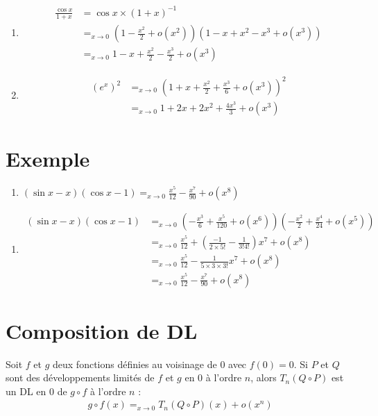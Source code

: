 \documentclass[../main.tex]{subfiles}
\begin{document}
\begin{enumerate}
    \item \begin{align*}
        \frac{\cos x}{1 + x} &= \cos x \times (1 + x)^{-1} \\
        &=_{x\to 0} (1 - \frac{x^2}{2} + o(x^2))(1 - x + x^2 - x^3 + o(x^3)) \\
        &=_{x\to 0} 1 - x + \frac{x^2}{2} - \frac{x^3}{2} + o(x^3)
    \end{align*}

    \item \begin{align*}
        (e^x)^2 &=_{x\to 0} (1 + x + \frac{x^2}{2} + \frac{x^3}{6} + o(x^3))^2 \\
        &=_{x\to 0} 1 + 2x + 2x^2 + \frac{4x^3}{3} + o(x^3)
    \end{align*}
\end{enumerate}

\section{Exemple}
\begin{tcolorbox}[title=Exemple 25.58, title filled=false, colframe=darkgreen, colback=darkgreen!10!white]
    \begin{enumerate}
        \item $(\sin x - x)(\cos x - 1) =_{x\to 0} \frac{x^5}{12} - \frac{x^7}{90} + o(x^8)$
    \end{enumerate}
\end{tcolorbox}

\begin{enumerate}
    \item \begin{align*}
        (\sin x - x)(\cos x - 1) &=_{x\to 0} \left( -\frac{x^3}{6} + \frac{x^5}{120} + o(x^6) \right) \left( -\frac{x^2}{2} + \frac{x^4}{24} + o(x^5) \right) \\
        &=_{x\to 0} \frac{x^5}{12} + \left( \frac{-1}{2 \times 5!} - \frac{1}{3!4!} \right) x^7 + o(x^8) \\
        &=_{x\to 0} \frac{x^5}{12} - \frac{1}{5 \times 3 \times 3!} x^7 + o(x^8) \\
        &=_{x\to 0} \frac{x^5}{12} - \frac{x^7}{90} + o(x^8)
    \end{align*}
\end{enumerate}

\section{Composition de DL}
\begin{tcolorbox}[title=Propostion 25.59, title filled=false, colframe=lightblue, colback=lightblue!10!white]
    Soit $f$ et $g$ deux fonctions définies au voisinage de $0$ avec $f(0) = 0$. Si $P$ et $Q$ sont des développements limités de $f$ et $g$ en $0$ à l'ordre $n$, alors $T_n(Q\circ P)$ est un DL en $0$ de $g\circ f$ à l'ordre $n$ : 
    \begin{align*}
        g \circ f(x) =_{x\to 0} T_n(Q\circ P)(x) + o(x^n)
    \end{align*}
\end{tcolorbox}
\end{document}
